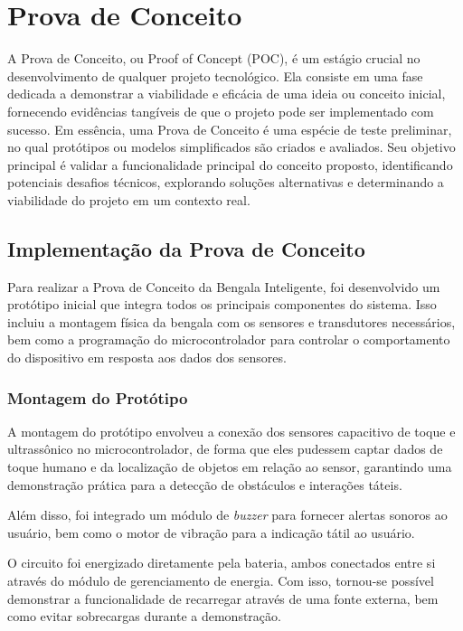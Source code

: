 \chapter{Prova de Conceito}
\label{chap:prova-de-conceito}

A Prova de Conceito, ou Proof of Concept (POC), é um estágio crucial no desenvolvimento de qualquer projeto tecnológico. Ela consiste em uma fase dedicada a demonstrar a viabilidade e eficácia de uma ideia ou conceito inicial, fornecendo evidências tangíveis de que o projeto pode ser implementado com sucesso. Em essência, uma Prova de Conceito é uma espécie de teste preliminar, no qual protótipos ou modelos simplificados são criados e avaliados. Seu objetivo principal é validar a funcionalidade principal do conceito proposto, identificando potenciais desafios técnicos, explorando soluções alternativas e determinando a viabilidade do projeto em um contexto real.

\section{Implementação da Prova de Conceito}

Para realizar a Prova de Conceito da Bengala Inteligente, foi desenvolvido um protótipo inicial que integra todos os principais componentes do sistema. Isso incluiu a montagem física da bengala com os sensores e transdutores necessários, bem como a programação do microcontrolador para controlar o comportamento do dispositivo em resposta aos dados dos sensores.

\subsection{Montagem do Protótipo}

A montagem do protótipo envolveu a conexão dos sensores capacitivo de toque e ultrassônico no microcontrolador, de forma que eles pudessem captar dados de toque humano e da localização de objetos em relação ao sensor, garantindo uma demonstração prática para a detecção de obstáculos e interações táteis. 

Além disso, foi integrado um módulo de \textit{buzzer} para fornecer alertas sonoros ao usuário, bem como o motor de vibração para a indicação tátil ao usuário.

O circuito foi energizado diretamente pela bateria, ambos conectados entre si através do módulo de gerenciamento de energia. Com isso, tornou-se possível demonstrar a funcionalidade de recarregar através de uma fonte externa, bem como evitar sobrecargas durante a demonstração.

